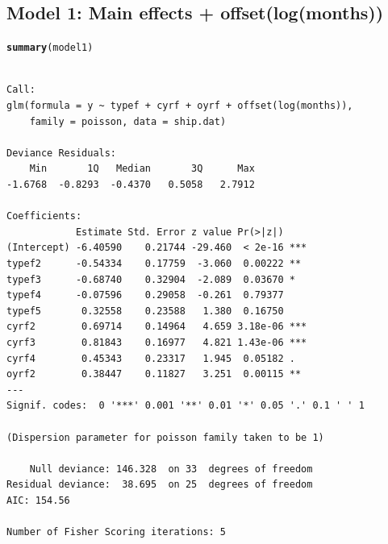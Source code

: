 \documentclass{article}\usepackage[]{graphicx}\usepackage[svgnames]{xcolor}
\makeatletter
\newcommand{\hlstd}[1]{\textcolor[rgb]{0.345,0.345,0.345}{#1}}%
\newcommand{\hlkwd}[1]{\textcolor[rgb]{0.737,0.353,0.396}{\textbf{#1}}}%
\newenvironment{kframe}{%
 \def\at@end@of@kframe{}%
 \ifinner\ifhmode%
  \def\at@end@of@kframe{\end{minipage}}%
  \begin{minipage}{\columnwidth}%
 \fi\fi%
 \def\FrameCommand##1{\hskip\@totalleftmargin \hskip-\fboxsep
 \colorbox{shadecolor}{##1}\hskip-\fboxsep
     \hskip-\linewidth \hskip-\@totalleftmargin \hskip\columnwidth}%
 \MakeFramed {\advance\hsize-\width
   \@totalleftmargin\z@ \linewidth\hsize
   \@setminipage}}%
 {\par\unskip\endMakeFramed%
 \at@end@of@kframe}
\newenvironment{knitrout}{}{} %
\makeatother
\begin{document}
\subsection*{Model 1: Main effects + offset(log(months))}
\begin{knitrout}
\color{fgcolor}\begin{kframe}
\begin{alltt}
\hlkwd{summary}\hlstd{(model1)}
\end{alltt}
\begin{verbatim}

Call:
glm(formula = y ~ typef + cyrf + oyrf + offset(log(months)), 
    family = poisson, data = ship.dat)

Deviance Residuals: 
    Min       1Q   Median       3Q      Max  
-1.6768  -0.8293  -0.4370   0.5058   2.7912  

Coefficients:
            Estimate Std. Error z value Pr(>|z|)    
(Intercept) -6.40590    0.21744 -29.460  < 2e-16 ***
typef2      -0.54334    0.17759  -3.060  0.00222 ** 
typef3      -0.68740    0.32904  -2.089  0.03670 *  
typef4      -0.07596    0.29058  -0.261  0.79377    
typef5       0.32558    0.23588   1.380  0.16750    
cyrf2        0.69714    0.14964   4.659 3.18e-06 ***
cyrf3        0.81843    0.16977   4.821 1.43e-06 ***
cyrf4        0.45343    0.23317   1.945  0.05182 .  
oyrf2        0.38447    0.11827   3.251  0.00115 ** 
---
Signif. codes:  0 '***' 0.001 '**' 0.01 '*' 0.05 '.' 0.1 ' ' 1

(Dispersion parameter for poisson family taken to be 1)

    Null deviance: 146.328  on 33  degrees of freedom
Residual deviance:  38.695  on 25  degrees of freedom
AIC: 154.56

Number of Fisher Scoring iterations: 5
\end{verbatim}
\end{kframe}
\end{knitrout}
\end{document}
